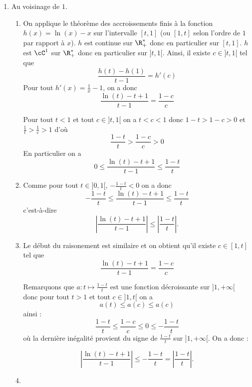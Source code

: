 \begin{correction}
\begin{enumerate}
\begin{enumerate}
\item On calcule le taux d'accroissement en $0$ : 
$\tau_{g,x}   =\frac{g(x)-g(0)}{x-0}= \frac{g(x)}{x}$
Ainsi pour tout $x\in ]0,1[$: 
$$ \frac{x-1}{2\ln(x)}\leq \tau_{g,x}\leq \frac{x-1}{\ln(x)}$$
Comme $\lim_{x\tv 0} \frac{1)}{\ln(x)} =0$, de nouveau d'après le théorème des gendarmes on a : $\lim_{x\tv 0} \tau_{g,x}  =0$ et ainsi $g$ est dérivable en $0$ et on a $g'(0) = 0$. 




\end{enumerate}
\item Au voisinage de $1$. 
\begin{enumerate}
\item 
On applique le théorème des accroissements finis à la fonction $h(x) = \ln(x) -x$ sur l'intervalle $[t,1]$ (ou $[1,t]$ selon l'ordre de $1$ par rapport à $x$). 
$h $ est continue sur $\R_+^*$ donc en particulier sur $[t,1]$. $h$ est $\cC^1$ sur $\R_+^*$ donc en particulier sur $]t,1[$. Ainsi, il existe $c\in ]t,1[$  tel que 
$$\frac{h(t)-h(1)}{t-1}=h'(c) $$
Pour tout 
$h'(x) = \frac{1}{x}-1$, on a donc 
$$\frac{\ln(t)- t +1}{t-1} =\frac{1-c}{c}$$

Pour tout $t<1$ et tout $c\in ]t,1[$  on  a 
$t<c<1 $ donc $1-t> 1-c >0$ et $\frac{1}{t}>\frac{1}{c}>1$ d'où 
$$\frac{1-t}{t} > \frac{1-c}{c}>0$$
En particulier on a 
$$0\leq \frac{\ln(t) - t+ 1 }{t-1}\leq \frac{1-t}{t} $$

\item  Comme pour tout $t\in ]0,1[$, $-\frac{1-t}{t}<0$ on a donc 
$$-\frac{1-t}{t} \leq \frac{\ln(t) - t+ 1 }{t-1}\leq \frac{1-t}{t} $$
c'est-à-dire 
$$\left|\frac{\ln(t) - t+ 1 }{t-1}\right|\leq \left|\frac{1-t}{t}\right|.$$


\item Le début du raisonement est similaire et on obtient qu'il existe $c\in [1,t]$ tel que $$\frac{\ln(t)- t +1}{t-1} =\frac{1-c}{c}$$

Remarquons que $a:t\mapsto \frac{1-t}{t}$ est une fonction décroissante sur $]1,+\infty[$ donc pour tout $t>1$ et tout $c\in ]1,t[$ on a 
$$a(t)\leq a(c) \leq a(c)$$
ainsi : 
$$\frac{1-t}{t}\leq \frac{1-c}{c}\leq 0 \leq-\frac{1-t}{t} $$
où la dernière inégalité provient du signe de $\frac{1-t}{t}$ sur $]1,+\infty[$. 
On a donc  :




$$\left|\frac{\ln(t) - t+ 1 }{t-1}\right|\leq -\frac{1-t}{t} =\left|\frac{1-t}{t}\right|.$$

\item 


\end{enumerate}
\end{enumerate}
\end{correction}
